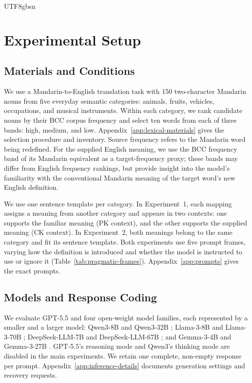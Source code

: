 \documentclass[11pt]{article}
\begin{document}
\begin{CJK*}{UTF8}{gbsn}
\section{Experimental Setup}
\label{sec:experimental-setup}

\subsection{Materials and Conditions}
\label{sec:materials-conditions}

We use a Mandarin-to-English translation task with 150 two-character Mandarin nouns from five everyday semantic categories: animals, fruits, vehicles, occupations, and musical instruments. 
Within each category, we rank candidate nouns by their BCC corpus frequency \citep{xun2016bcc} and select ten words from each of three bands: high, medium, and low. Appendix~\ref{app:lexical-materials} gives the selection procedure and inventory. Source frequency refers to the Mandarin word being redefined. For the supplied English meaning, we use the BCC frequency band of its Mandarin equivalent as a target-frequency proxy; these bands may differ from English frequency rankings, but provide insight into the model's familiarity with the conventional Mandarin meaning of the target word's new English definition.

We use one sentence template per category. In Experiment~1, each mapping assigns a meaning from another category and appears in two contexts: one supports the familiar meaning (PK context), and the other supports the supplied meaning (CK context). In Experiment~2, both meanings belong to the same category and fit its sentence template. Both experiments use five prompt frames, varying how the definition is introduced and whether the model is instructed to use or ignore it (Table~\ref{tab:pragmatic-frames}). Appendix~\ref{app:prompts} gives the exact prompts.

\subsection{Models and Response Coding}
\label{sec:models-coding}

We evaluate GPT-5.5 \citep{openai2026gpt55} and four open-weight model families, each represented by a smaller and a larger model: Qwen3-8B and Qwen3-32B \citep{yang2025qwen3}; Llama-3-8B and Llama-3-70B \citep{llama3modelcard}; DeepSeek-LLM-7B and DeepSeek-LLM-67B \citep{deepseekai2024deepseekllm}; and Gemma-3-4B and Gemma-3-27B \citep{gemmateam2025gemma3}. GPT-5.5's reasoning mode and Qwen3's thinking mode are disabled in the main experiments. We retain one complete, non-empty response per prompt. Appendix~\ref{app:inference-details} documents generation settings and recovery requests.


\end{CJK*}
\end{document}
